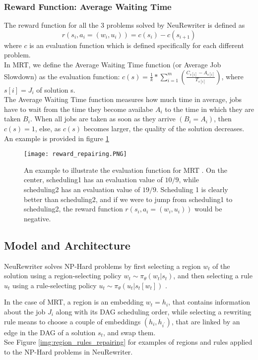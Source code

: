 \documentclass[12pt]{article}
\begin{document}
\medbreak
\subsubsection{Reward Function: Average Waiting Time}
The reward function for all the 3 problems solved by NeuRewriter is defined as $$r(s_i, a_i=(w_i,u_i)) = c(s_i) - c(s_{i+1})$$ where $c$ is an evaluation function which is defined specifically for each different problem.\\
In MRT, we define the Average Waiting Time function (or Average Job Slowdown) as the evaluation function: $c(s) = \frac{1}{k} * \sum_{i=1}^{m}(\frac{C_{s[i]} - A_{s[i]}}{T_{s[i]}})$, where $s[i] = J_i$ of solution s.\\
 The Average Waiting Time function measures how much time in average, jobs have to wait from the 
time they become availabe $A_i$ to the time in which they are taken $B_i$. When all jobs are taken as soon as they arrive $(B_i=A_i)$, then $c(s)=1$, else, as $c(s)$ becomes larger, the quality of the solution decreases. An example is provided in figure \ref{img:mrt_reward}

\begin{figure}[H]
    \centering
    \texttt{[image: reward\_repairing.PNG]}
    \caption{An example to illustrate the evaluation function for MRT \cite{neu_rewriter}. On the center, scheduling1 has an evaluation value of $10/9$, while scheduling2 has an evaluation value of $19/9$. Scheduling 1 is clearly better than scheduling2, and if we were to jump from scheduling1 to scheduling2, the reward function $r(s_i, a_i=(w_i,u_i))$ would be negative.}
    \label{img:mrt_reward}
\end{figure}

\medbreak
\subsection{Model and Architecture}
NeuRewriter solves NP-Hard problems by first selecting a region $w_t$ of the solution using a region-selecting policy $w_t \sim \pi_{\theta}(w_t|s_t)$, and then selecting a 
rule $u_t$ using a rule-selecting policy $u_t \sim \pi_{\theta}(u_t|s_t[w_t])$ \cite{neu_rewriter}.

\medbreak
In the case of MRT, a region is an embedding $w_t = h_i$, that contains information about the job $J_i$ along with its DAG scheduling order, while selecting a rewriting rule means to choose a couple of embeddings $(h_i, h_{i^{'}})$, that are linked by an edge in the DAG of a solution $s_t$, and swap them.\\
See Figure \ref{img:region_rules_repairing} for examples of regions and rules applied to the NP-Hard problems in NeuRewriter.
\end{document}
